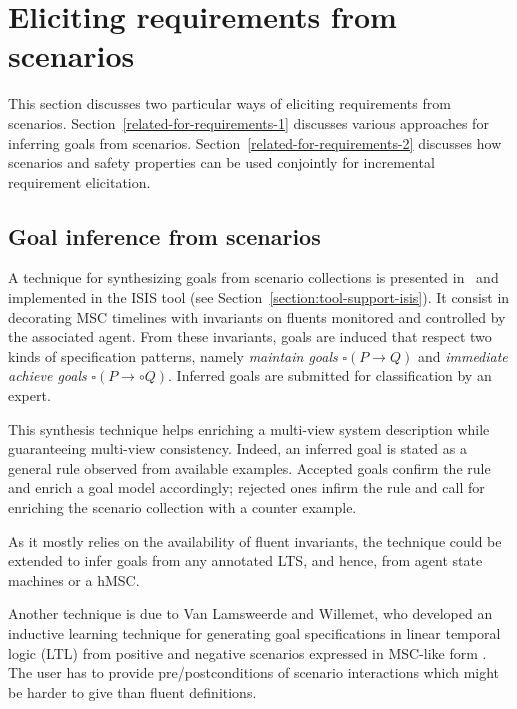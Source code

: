 \section{Eliciting requirements from scenarios\label{section:related-for-requirements}}

This section discusses two particular ways of eliciting requirements from scenarios. Section~\ref{related-for-requirements-1} discusses various approaches for inferring goals from scenarios. Section~\ref{related-for-requirements-2} discusses how scenarios and safety properties can be used conjointly for incremental requirement elicitation. 

\subsection{Goal inference from scenarios\label{related-for-requirements-1}}

A technique for synthesizing goals from scenario collections is presented in~\cite{Damas:2006, Damas:2011} and implemented in the ISIS tool (see Section~\ref{section:tool-support-isis}). It consist in decorating MSC timelines with invariants on fluents monitored and controlled by the associated agent. From these invariants, goals are induced that respect two kinds of specification patterns, namely \emph{maintain goals} $\square(P \rightarrow Q)$ and \emph{immediate achieve goals} $\square(P \rightarrow \circ Q)$. Inferred goals are submitted for classification by an expert. 

This synthesis technique helps enriching a multi-view system description while guaranteeing multi-view consistency. Indeed, an inferred goal is stated as a general rule observed from available examples. Accepted goals confirm the rule and enrich a goal model accordingly; rejected ones infirm the rule and call for enriching the scenario collection with a counter example. 

As it mostly relies on the availability of fluent invariants, the technique could be extended to infer goals from any annotated LTS, and hence, from agent state machines or a hMSC. 

Another technique is due to Van Lamsweerde and Willemet, who developed an inductive learning technique for generating goal specifications in linear temporal logic (LTL) from positive and negative scenarios expressed in MSC-like form \cite{VanLamsweerde:1998}. The user has to provide pre/postconditions of scenario interactions which might be harder to give than fluent definitions.

